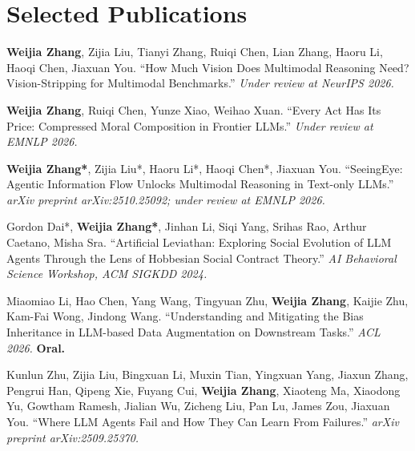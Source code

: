\section{Selected Publications}
\begin{itemize}[leftmargin=0.15in, label={}]
  \small{
    \item \textbf{Weijia Zhang}, Zijia Liu, Tianyi Zhang, Ruiqi Chen, Lian Zhang, Haoru Li, Haoqi Chen, Jiaxuan You.
    ``How Much Vision Does Multimodal Reasoning Need? Vision-Stripping for Multimodal Benchmarks.''
    \textit{Under review at NeurIPS 2026.}

    \item \textbf{Weijia Zhang}, Ruiqi Chen, Yunze Xiao, Weihao Xuan.
    ``Every Act Has Its Price: Compressed Moral Composition in Frontier LLMs.''
    \textit{Under review at EMNLP 2026.}

    \item \textbf{Weijia Zhang*}, Zijia Liu*, Haoru Li*, Haoqi Chen*, Jiaxuan You.
    ``SeeingEye: Agentic Information Flow Unlocks Multimodal Reasoning in Text-only LLMs.''
    \textit{arXiv preprint arXiv:2510.25092; under review at EMNLP 2026.}

    \item Gordon Dai*, \textbf{Weijia Zhang*}, Jinhan Li, Siqi Yang, Srihas Rao, Arthur Caetano, Misha Sra.
    ``Artificial Leviathan: Exploring Social Evolution of LLM Agents Through the Lens of Hobbesian Social Contract Theory.''
    \textit{AI Behavioral Science Workshop, ACM SIGKDD 2024.}

    \item Miaomiao Li, Hao Chen, Yang Wang, Tingyuan Zhu, \textbf{Weijia Zhang}, Kaijie Zhu, Kam-Fai Wong, Jindong Wang.
    ``Understanding and Mitigating the Bias Inheritance in LLM-based Data Augmentation on Downstream Tasks.''
    \textit{ACL 2026.} \textbf{Oral.}

    \item Kunlun Zhu, Zijia Liu, Bingxuan Li, Muxin Tian, Yingxuan Yang, Jiaxun Zhang, Pengrui Han, Qipeng Xie,
    Fuyang Cui, \textbf{Weijia Zhang}, Xiaoteng Ma, Xiaodong Yu, Gowtham Ramesh, Jialian Wu, Zicheng Liu, Pan Lu, James Zou, Jiaxuan You.
    ``Where LLM Agents Fail and How They Can Learn From Failures.''
    \textit{arXiv preprint arXiv:2509.25370.}
  }
\end{itemize}
